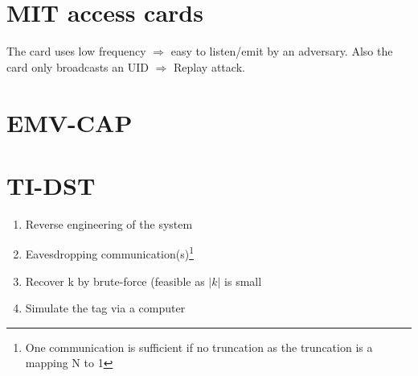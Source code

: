 \section{MIT access cards}
The card uses low frequency $\Rightarrow$ easy to listen/emit by an adversary. Also the card only broadcasts an UID $\Rightarrow$ Replay attack.

\section{EMV-CAP}


\section{TI-DST}
\begin{enumerate}
\item Reverse engineering of the system
\item Eavesdropping communication(s)\footnote{One communication is sufficient if no truncation as the truncation is a mapping N to 1}
\item Recover k by brute-force (feasible as $|k|$ is small
\item Simulate the tag via a computer
\end{enumerate}
